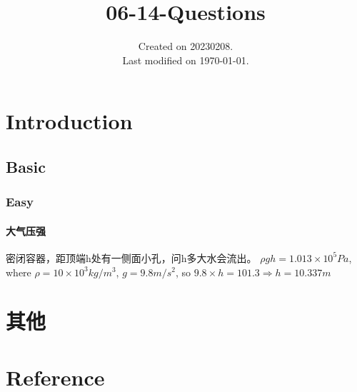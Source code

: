 \documentclass[UTF8]{../06-Physics}
\begin{document}
\title{06-14-Questions}
\date{Created on 20230208.\\   Last modified on \today.}
\maketitle
\tableofcontents


\chapter{Introduction}




\section{Basic}

\subsection{Easy}

\subsubsection{大气压强}
密闭容器，距顶端h处有一侧面小孔，问h多大水会流出。
$\rho g h = 1.013 \times 10^5 Pa$, where $ \rho = 10 \times 10^3 kg /m^3$, $g = 9.8 m / s^2 $, so $ 9.8 \times h = 101.3  \Rightarrow h = 10.337 m$



\chapter{其他}



\chapter{Reference}
\end{document}
